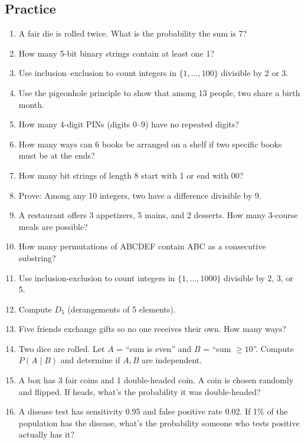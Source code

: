 \subsection*{Practice}
\begin{enumerate}
  \item A fair die is rolled twice. What is the probability the sum is 7?

  \item How many 5-bit binary strings contain at least one 1?

  \item Use inclusion--exclusion to count integers in $\{1, \ldots, 100\}$ divisible by 2 or 3.

  \item Use the pigeonhole principle to show that among 13 people, two share a birth month.

  \item How many 4-digit PINs (digits 0--9) have no repeated digits?

  \item How many ways can 6 books be arranged on a shelf if two specific books must be at the ends?

  \item How many bit strings of length 8 start with 1 or end with 00?

  \item Prove: Among any 10 integers, two have a difference divisible by 9.

  \item A restaurant offers 3 appetizers, 5 mains, and 2 desserts. How many 3-course meals are possible?

  \item How many permutations of ABCDEF contain ABC as a consecutive substring?

  \item Use inclusion-exclusion to count integers in $\{1, \ldots, 1000\}$ divisible by 2, 3, or 5.

  \item Compute $D_5$ (derangements of 5 elements).

  \item Five friends exchange gifts so no one receives their own. How many ways?

  \item Two dice are rolled. Let $A$ = ``sum is even'' and $B$ = ``sum $\geq 10$''. Compute $P(A \mid B)$ and determine if $A, B$ are independent.

  \item A box has 3 fair coins and 1 double-headed coin. A coin is chosen randomly and flipped. If heads, what's the probability it was double-headed?

  \item A disease test has sensitivity 0.95 and false positive rate 0.02. If 1\% of the population has the disease, what's the probability someone who tests positive actually has it?
\end{enumerate}
